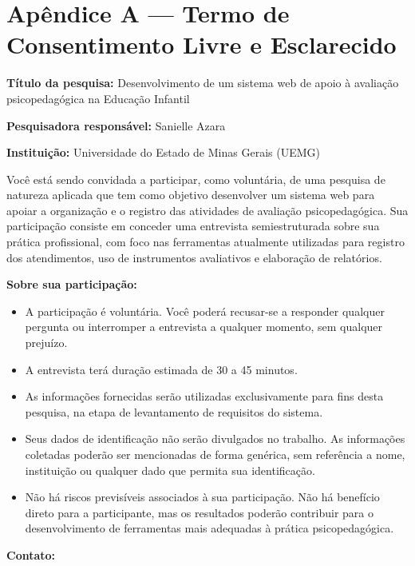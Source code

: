 \chapter*{Apêndice A — Termo de Consentimento Livre e Esclarecido}
\label{apendice:tcle}

\textbf{Título da pesquisa:} Desenvolvimento de um sistema web de apoio à avaliação psicopedagógica na Educação Infantil

\textbf{Pesquisadora responsável:} Sanielle Azara

\textbf{Instituição:} Universidade do Estado de Minas Gerais (UEMG)

\bigskip

Você está sendo convidada a participar, como voluntária, de uma pesquisa de natureza aplicada que tem como objetivo desenvolver um sistema web para apoiar a organização e o registro das atividades de avaliação psicopedagógica. Sua participação consiste em conceder uma entrevista semiestruturada sobre sua prática profissional, com foco nas ferramentas atualmente utilizadas para registro dos atendimentos, uso de instrumentos avaliativos e elaboração de relatórios.

\bigskip
\textbf{Sobre sua participação:}

\begin{itemize}
    \item A participação é voluntária. Você poderá recusar-se a responder qualquer pergunta ou interromper a entrevista a qualquer momento, sem qualquer prejuízo.
    \item A entrevista terá duração estimada de 30 a 45 minutos.
    \item As informações fornecidas serão utilizadas exclusivamente para fins desta pesquisa, na etapa de levantamento de requisitos do sistema.
    \item Seus dados de identificação não serão divulgados no trabalho. As informações coletadas poderão ser mencionadas de forma genérica, sem referência a nome, instituição ou qualquer dado que permita sua identificação.
    \item Não há riscos previsíveis associados à sua participação. Não há benefício direto para a participante, mas os resultados poderão contribuir para o desenvolvimento de ferramentas mais adequadas à prática psicopedagógica.
\end{itemize}

\bigskip
\textbf{Contato:}

